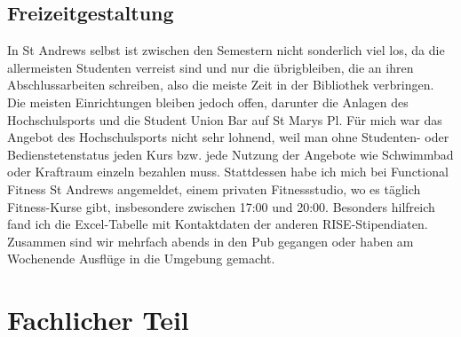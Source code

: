 \documentclass{article}
\begin{document}
\subsection{Freizeitgestaltung}
In St Andrews selbst ist zwischen den Semestern nicht sonderlich viel los, da die allermeisten Studenten verreist sind und nur die \"{u}brigbleiben, die an ihren Abschlussarbeiten schreiben, also die meiste Zeit in der Bibliothek verbringen. Die meisten Einrichtungen bleiben jedoch offen, darunter die Anlagen des Hochschulsports und die Student Union Bar auf St Marys Pl. F\"{u}r mich war das Angebot des Hochschulsports nicht sehr lohnend, weil man ohne Studenten- oder Bedienstetenstatus jeden Kurs bzw. jede Nutzung der Angebote wie Schwimmbad oder Kraftraum einzeln bezahlen muss. Stattdessen habe ich mich bei Functional Fitness St Andrews angemeldet, einem privaten Fitnessstudio, wo es t\"{a}glich Fitness-Kurse gibt, insbesondere zwischen 17:00 und 20:00. Besonders hilfreich fand ich die Excel-Tabelle mit Kontaktdaten der anderen RISE-Stipendiaten. Zusammen sind wir mehrfach abends in den Pub gegangen oder haben am Wochenende Ausfl\"{u}ge in die Umgebung gemacht.
\section{Fachlicher Teil}
\end{document}
